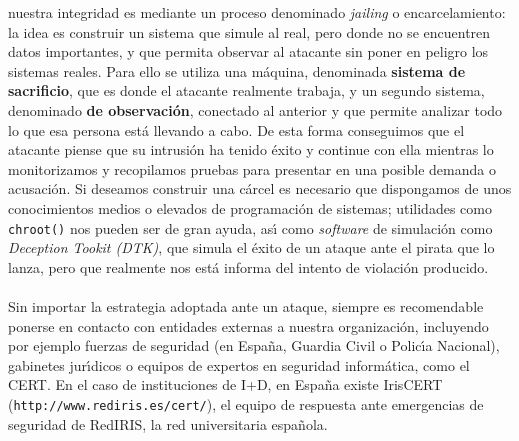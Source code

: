 nuestra integridad es mediante un proceso denominado {\it jailing} o 
encarcelamiento: la idea es construir un sistema que simule al real, pero donde
no se encuentren datos importantes, y que permita observar al atacante sin
poner en peligro los sistemas reales. Para ello se utiliza una m\'aquina,
denominada {\bf sistema de sacrificio}, que es donde el atacante realmente
trabaja, y un segundo sistema, denominado {\bf de observaci\'on}, conectado al
anterior y que permite analizar todo lo que esa persona est\'a llevando a cabo.
De esta forma conseguimos que el atacante piense que su intrusi\'on ha tenido
\'exito y continue con ella mientras lo monitorizamos y recopilamos pruebas
para presentar en una posible demanda o acusaci\'on. Si deseamos construir
una c\'arcel es necesario que dispongamos de unos conocimientos medios o 
elevados de programaci\'on de sistemas; utilidades como {\tt chroot()} nos
pueden ser de gran ayuda, as\'{\i} como {\it software} de simulaci\'on como 
{\it Deception Tookit (DTK)}, que simula el \'exito de un ataque ante el pirata 
que lo lanza, pero que realmente nos est\'a informa del intento de violaci\'on 
producido.\\
\\Sin importar la estrategia adoptada ante un ataque, siempre es recomendable
ponerse en contacto con entidades externas a nuestra organizaci\'on, incluyendo
por ejemplo fuerzas de seguridad (en Espa\~na, Guardia Civil o Polic\'{\i}a 
Nacional), gabinetes jur\'{\i}dicos o equipos de expertos en seguridad 
inform\'atica, como el CERT. En el caso de instituciones de I+D, en Espa\~na
existe IrisCERT ({\tt http://www.rediris.es/cert/}), el equipo de respuesta 
ante emergencias de seguridad de RedIRIS, la red universitaria espa\~nola.
